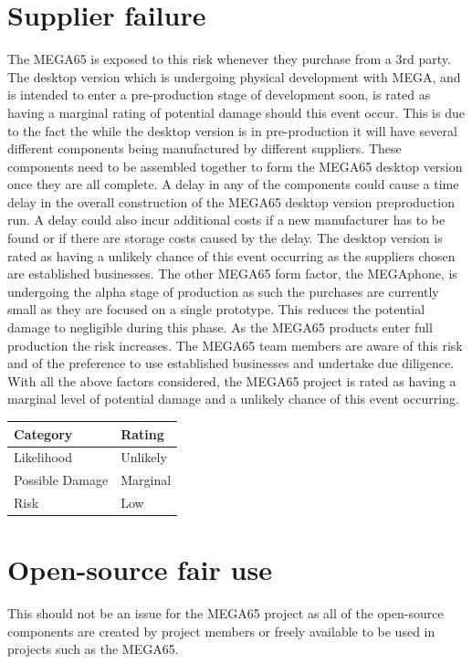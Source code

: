 \section{Supplier failure}
The MEGA65 is exposed to this risk whenever they purchase from a 3rd party. The desktop version which is undergoing physical development with MEGA, and is intended to enter a pre-production stage of development soon, is rated as having a marginal rating of potential damage should this event occur. This is due to the fact the while the desktop version is in pre-production it will have several different components being manufactured by different suppliers. These components need to be assembled together to form the MEGA65 desktop version once they are all complete. A delay in any of the components could cause a time delay in the overall construction of the MEGA65 desktop version preproduction run. A delay could also incur additional costs if a new manufacturer has to be found or if there are storage costs caused by the delay. The desktop version is rated as having a unlikely chance of this event occurring as the suppliers chosen are established businesses. The other MEGA65 form factor, the MEGAphone, is undergoing the alpha stage of production as such the purchases are currently small as they are focused on a single prototype. This reduces the potential damage to negligible during this phase. As the MEGA65 products enter full production the risk increases. The MEGA65 team members are aware of this risk and of the preference to use established businesses and undertake due diligence. With all the above factors considered, the MEGA65 project is rated as having a marginal level of potential damage and a unlikely chance of this event occurring. \\

\begin{tabular}{l|l} %
    	\textbf{Category} 	&	\textbf{Rating} \\
      \hline
     Likelihood			&	Unlikely \\
     Possible Damage 	& 	Marginal \\
     Risk 				&	Low		\\	
    \end{tabular}


\section{Open-source fair use}
This should not be an issue for the MEGA65 project as all of the open-source components are created by project members or freely available to be used in projects such as the MEGA65. \\

